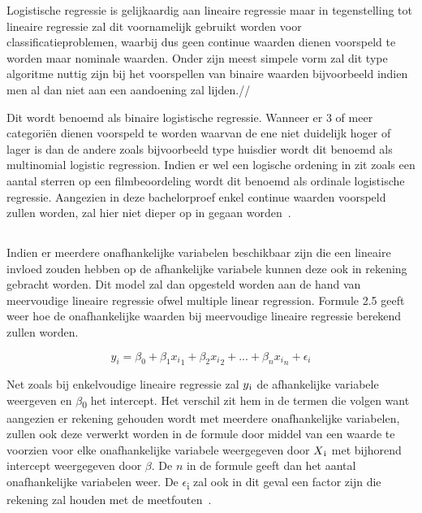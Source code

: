 Logistische regressie is gelijkaardig aan lineaire regressie maar in tegenstelling tot lineaire regressie zal dit voornamelijk gebruikt worden voor classificatieproblemen, waarbij dus geen continue waarden dienen voorspeld te worden maar nominale waarden. Onder zijn meest simpele vorm zal dit type algoritme nuttig zijn bij het voorspellen van binaire waarden bijvoorbeeld indien men al dan niet aan een aandoening zal lijden.//

Dit wordt benoemd als binaire logistische regressie. Wanneer er 3 of meer categori\"{e}n dienen voorspeld te worden waarvan de ene niet duidelijk hoger of lager is dan de andere zoals bijvoorbeeld type huisdier wordt dit benoemd als multinomial logistic regression. Indien er wel een logische ordening in zit zoals een aantal sterren op een filmbeoordeling wordt dit benoemd als ordinale logistische regressie.
Aangezien in deze bachelorproef enkel continue waarden voorspeld zullen worden, zal hier niet dieper op in gegaan worden~\autocite{Swaminathan2018}.

\subsection{}

Indien er meerdere onafhankelijke variabelen beschikbaar zijn die een lineaire invloed zouden hebben op de afhankelijke variabele kunnen deze ook in rekening gebracht worden. Dit model zal dan opgesteld worden aan de hand van meervoudige lineaire regressie ofwel multiple linear regression. Formule 2.5 geeft weer hoe de onafhankelijke waarden bij meervoudige lineaire regressie berekend zullen worden.

\begin{equation}
y_i = \beta_0 + \beta_1 {x_i}_1 + \beta_2 {x_i}_2 + ... + \beta_n {x_i}_n + \epsilon_i
\end{equation}

Net zoals bij enkelvoudige lineaire regressie zal $y\textsubscript{i}$ de afhankelijke variabele weergeven en $\beta$\textsubscript{0} het intercept. Het verschil zit hem in de termen die volgen want aangezien er rekening gehouden wordt met meerdere onafhankelijke variabelen, zullen ook deze verwerkt worden in de formule door middel van een waarde te voorzien voor elke onafhankelijke variabele weergegeven door $X\textsubscript{i}$ met bijhorend intercept weergegeven door $\beta$. De $n$ in de formule geeft dan het aantal onafhankelijke variabelen weer. De $\epsilon$\textsubscript{i} zal ook in dit geval een factor zijn die rekening zal houden met de meetfouten~\autocite{Kenton2020}.

